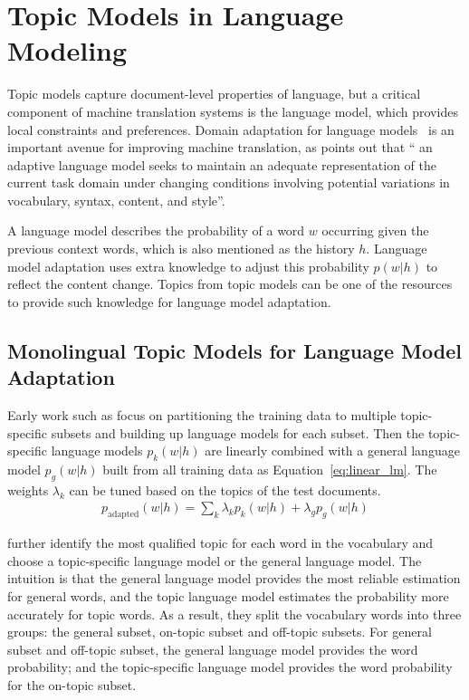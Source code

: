 \section{Topic Models in Language Modeling}

Topic models capture document-level properties of language, but a critical component of machine translation systems is the language model, which provides local constraints and preferences. Domain adaptation for language models~\citep{Bellegarda-04,wood-09} is an important avenue for improving machine translation, as \citet{Bellegarda-04} points out that `` an adaptive language model seeks to maintain an adequate representation of the current task domain under changing conditions involving potential variations in vocabulary, syntax, content, and style''.

A language model describes the probability of a word $w$ occurring given the previous context words, which is also mentioned as the history $h$. Language model adaptation uses extra knowledge to adjust this probability $p(w|h)$ to reflect the content change. Topics from topic models can be one of the resources to provide such knowledge for language model adaptation.

\subsection{Monolingual Topic Models for Language Model Adaptation}

Early work such as \citet{Clarkson-1997,Seymore-1997,Kneser-1997,Iyer-1999} focus on partitioning the training data to multiple topic-specific subsets and building up language models for each subset. Then the topic-specific language models $p_k(w|h)$ are linearly combined with a general language model $p_g(w|h)$ built from all training data as Equation~\ref{eq:linear_lm}. The weights $\lambda_k$ can be tuned based on the topics of the test documents. 
\begin{align}
\label{eq:linear_lm}
p_\textrm{adapted}(w|h) = \sum_k \lambda_k p_k(w|h) + \lambda_g p_g(w|h)
\end{align} 

\citet{Seymore-1998} further identify the most qualified topic for each word in the vocabulary and choose a topic-specific language model or the general language model. The intuition is that the general language model provides the most reliable estimation for general words, and the topic language model estimates the probability more accurately for topic words. As a result, they split the vocabulary words into three groups: the general subset, on-topic subset and off-topic subsets. For general subset and off-topic subset, the general language model provides the word probability; and the topic-specific language model provides the word probability for the on-topic subset. 

